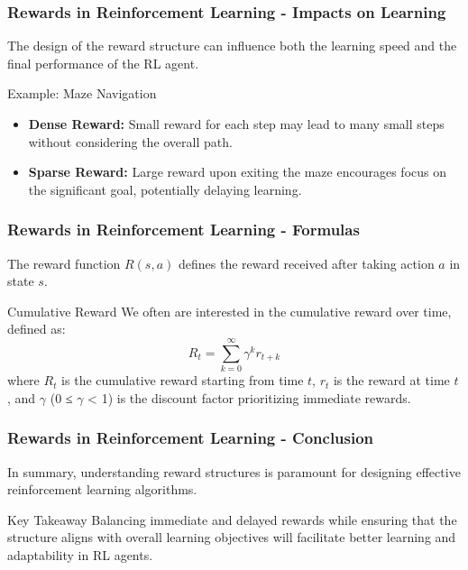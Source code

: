 \documentclass[aspectratio=169]{beamer}
\begin{document}
\begin{frame}[fragile]
    \frametitle{Rewards in Reinforcement Learning - Impacts on Learning}
    The design of the reward structure can influence both the learning speed and the final performance of the RL agent.
    
    \begin{block}{Example: Maze Navigation}
        \begin{itemize}
            \item \textbf{Dense Reward:} Small reward for each step may lead to many small steps without considering the overall path.
            \item \textbf{Sparse Reward:} Large reward upon exiting the maze encourages focus on the significant goal, potentially delaying learning.
        \end{itemize}
    \end{block}
\end{frame}

\begin{frame}[fragile]
    \frametitle{Rewards in Reinforcement Learning - Formulas}
    The reward function \( R(s, a) \) defines the reward received after taking action \( a \) in state \( s \).
    
    \begin{block}{Cumulative Reward}
        We often are interested in the cumulative reward over time, defined as:
        \begin{equation}
            R_t = \sum_{k=0}^{\infty} \gamma^k r_{t+k}
        \end{equation}
        where \( R_t \) is the cumulative reward starting from time \( t \), \( r_t \) is the reward at time \( t \), and \( \gamma \) (0 ≤ \( \gamma \) < 1) is the discount factor prioritizing immediate rewards.
    \end{block}
\end{frame}

\begin{frame}[fragile]
    \frametitle{Rewards in Reinforcement Learning - Conclusion}
    In summary, understanding reward structures is paramount for designing effective reinforcement learning algorithms.
    
    \begin{block}{Key Takeaway}
        Balancing immediate and delayed rewards while ensuring that the structure aligns with overall learning objectives will facilitate better learning and adaptability in RL agents.
    \end{block}
\end{frame}
\end{document}
